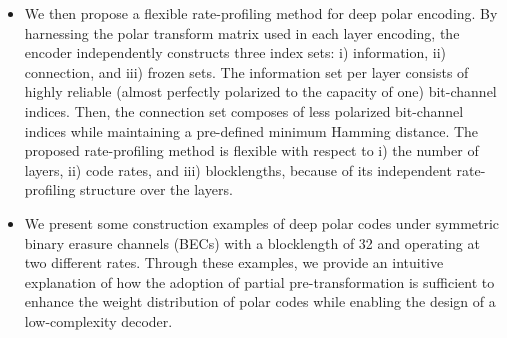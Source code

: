 \documentclass[conference]{IEEEtran}
\begin{document}
\begin{itemize}
    	
        \item  We then propose a flexible rate-profiling method for deep polar encoding. By harnessing the polar transform matrix used in each layer encoding, the encoder independently constructs three index sets: i) information, ii) connection, and iii) frozen sets. The information set per layer consists of highly reliable (almost perfectly polarized to the capacity of one) bit-channel indices. Then, the connection set composes of less polarized bit-channel indices while maintaining a pre-defined minimum Hamming distance. The proposed rate-profiling method is flexible with respect to i) the number of layers, ii) code rates, and iii) blocklengths, because of its independent rate-profiling structure over the layers. 

    \item We present some construction examples of deep polar codes under symmetric binary erasure channels (BECs) with a blocklength of 32 and operating at two different rates. Through these examples, we provide an intuitive explanation of how the adoption of partial pre-transformation is sufficient to enhance the weight distribution of polar codes while enabling the design of a low-complexity decoder.
        
        
        
        
        

\end{itemize}
\end{document}
